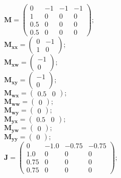 \documentclass[11pt, oneside]{article}      %
\begin{document}
%
$ \mathbf{M} = \left(\begin{array}{cccc}0 & -1 & -1 & -1\\1 & 0 & 0 & 0\\0.5 & 0 & 0 & 0\\0.5 & 0 & 0 & 0\end{array}\right) ; $ 
%
\\
%
$ \mathbf{M_{xx}} = \left(\begin{array}{cc}0 & -1\\1 & 0\end{array}\right) ; $ 
%
\\
%
$ \mathbf{M_{xw}} = \left(\begin{array}{c}-1\\0\end{array}\right) ; $ 
%
\\
%
$ \mathbf{M_{xy}} = \left(\begin{array}{c}-1\\0\end{array}\right) ; $ 
%
\\
%
$ \mathbf{M_{wx}} = \left(\begin{array}{cc}0.5 & 0\end{array}\right) ; $ 
%
\\
%
$ \mathbf{M_{ww}} = \left(\begin{array}{c}0\end{array}\right) ; $ 
%
\\
%
$ \mathbf{M_{wy}} = \left(\begin{array}{c}0\end{array}\right) ; $ 
%
\\
%
$ \mathbf{M_{yx}} = \left(\begin{array}{cc}0.5 & 0\end{array}\right) ; $ 
%
\\
%
$ \mathbf{M_{yw}} = \left(\begin{array}{c}0\end{array}\right) ; $ 
%
\\
%
$ \mathbf{M_{yy}} = \left(\begin{array}{c}0\end{array}\right) ; $ 
%
\\
%
$ \mathbf{J} = \left(\begin{array}{cccc}0 & -1.0 & -0.75 & -0.75\\1.0 & 0 & 0 & 0\\0.75 & 0 & 0 & 0\\0.75 & 0 & 0 & 0\end{array}\right) ; $ 
\end{document}
